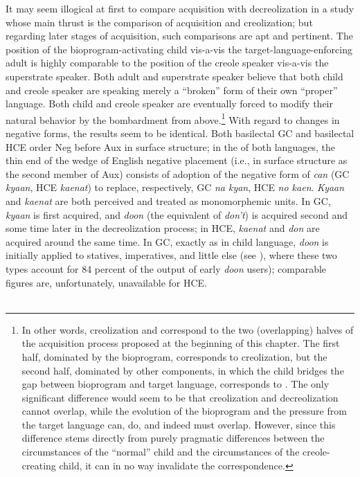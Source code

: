 It may seem illogical at first to compare acquisition with de\-creolization in a study whose main thrust is the comparison of acquisi\-tion and creolization; but regarding later stages of acquisition, such comparisons are apt and pertinent. The position of the bioprogram-activating child vis-a-vis the target-language-enforcing adult is highly comparable to the position of the creole speaker vis-a-vis the superstrate speaker. Both adult and superstrate speaker believe that both child and creole speaker are speaking merely a ``broken'' form of their own ``proper'' language. Both child and creole speaker are eventually forced to modify their natural behavior by the bombardment from above.\footnote{In other words, creolization and  correspond to the two (overlapping) halves of the acquisition process proposed at the beginning of this chapter. The first half, dominated by the bioprogram, corresponds to creolization, but the second half, dominated by other components, in which the child bridges the gap between bioprogram and target language, corresponds to . The only significant difference would seem to be that creolization and decreolization cannot overlap, while the evolution of the bioprogram and the pressure from the target language can, do, and indeed must overlap. However, since this difference stems directly from purely pragmatic differences between the circumstances of the ``normal'' child and the circumstances of the creole-creating child, it can in no way invalidate the correspondence.} With regard to changes in negative forms, the results seem to be identical. Both basilectal GC and basilectal HCE order Neg
before Aux in surface structure; in the  of both languages, the thin end of the wedge of English negative placement (i.e., in surface structure as the second member of Aux) consists of adoption of the negative form of \textit{can} (GC \textit{kyaan}, HCE \textit{kaenat}) to replace, respectively, GC \textit{na kyan}, HCE \textit{no kaen}. \textit{Kyaan} and \textit{kaenat} are both perceived and treated as monomorphemic units. In GC, \textit{kyaan} is first acquired, and \textit{doon} (the equivalent of \textit{don't}) is acquired second and some time later in the decreolization process; in HCE, \textit{kaenat} and \textit{don} are acquired around the same time. In GC, exactly as in child language, \textit{doon} is initially applied to statives, imperatives, and little else (see \citealt[Table~3.9]{Bickerton1975}), where these two types account for 84 percent of the output of early \textit{doon} users); comparable figures are, unfortunately, unavailable for HCE.\\\\

